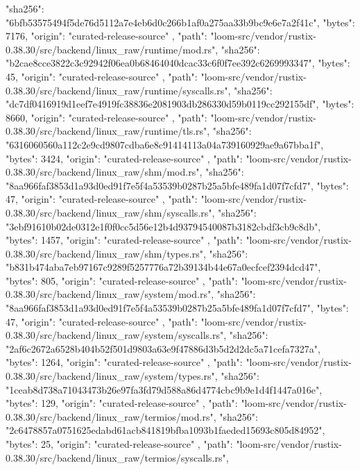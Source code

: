 {{      "sha256": "6bfb53575494f5de76d5112a7e4eb6d0c266b1af0a275aa33b9bc9e6e7a2f41c",
      "bytes": 7176,
      "origin": "curated-release-source"
    },
    {
      "path": "loom-src/vendor/rustix-0.38.30/src/backend/linux_raw/runtime/mod.rs",
      "sha256": "b2cae8cce3822c3c92942f06ea0b68464040dcac33c6f0f7ee392c6269993347",
      "bytes": 45,
      "origin": "curated-release-source"
    },
    {
      "path": "loom-src/vendor/rustix-0.38.30/src/backend/linux_raw/runtime/syscalls.rs",
      "sha256": "dc7df0416919d1eef7e4919fc38836e2081903db286330d59b0119cc292155df",
      "bytes": 8660,
      "origin": "curated-release-source"
    },
    {
      "path": "loom-src/vendor/rustix-0.38.30/src/backend/linux_raw/runtime/tls.rs",
      "sha256": "6316060560a112c2e9cd9807cdba6e8c91414113a04a739160929ae9a67bba1f",
      "bytes": 3424,
      "origin": "curated-release-source"
    },
    {
      "path": "loom-src/vendor/rustix-0.38.30/src/backend/linux_raw/shm/mod.rs",
      "sha256": "8aa966faf3853d1a93d0ed91f7e5f4a53539b0287b25a5bfe489fa1d07f7cfd7",
      "bytes": 47,
      "origin": "curated-release-source"
    },
    {
      "path": "loom-src/vendor/rustix-0.38.30/src/backend/linux_raw/shm/syscalls.rs",
      "sha256": "3ebf91610b02de0312e1f0f0cc5d56e12b4d93794540087b3182cbdf3cb9c8db",
      "bytes": 1457,
      "origin": "curated-release-source"
    },
    {
      "path": "loom-src/vendor/rustix-0.38.30/src/backend/linux_raw/shm/types.rs",
      "sha256": "b831b474aba7eb97167c9289f5257776a72b39134b44e67a0ecfcef2394dcd47",
      "bytes": 805,
      "origin": "curated-release-source"
    },
    {
      "path": "loom-src/vendor/rustix-0.38.30/src/backend/linux_raw/system/mod.rs",
      "sha256": "8aa966faf3853d1a93d0ed91f7e5f4a53539b0287b25a5bfe489fa1d07f7cfd7",
      "bytes": 47,
      "origin": "curated-release-source"
    },
    {
      "path": "loom-src/vendor/rustix-0.38.30/src/backend/linux_raw/system/syscalls.rs",
      "sha256": "2af6c2672a6528b404b52f501d9803a63e9f47886d3b5d2d2dc5a71cefa7327a",
      "bytes": 1264,
      "origin": "curated-release-source"
    },
    {
      "path": "loom-src/vendor/rustix-0.38.30/src/backend/linux_raw/system/types.rs",
      "sha256": "1ceab8d738a71043473b26e97fa3fd79d588a86d4774cbc9b9e1d4f1447a016e",
      "bytes": 129,
      "origin": "curated-release-source"
    },
    {
      "path": "loom-src/vendor/rustix-0.38.30/src/backend/linux_raw/termios/mod.rs",
      "sha256": "2c6478857a0751625edabd61acb841819bfba1093b1faeded15693c805d84952",
      "bytes": 25,
      "origin": "curated-release-source"
    },
    {
      "path": "loom-src/vendor/rustix-0.38.30/src/backend/linux_raw/termios/syscalls.rs",
}}
